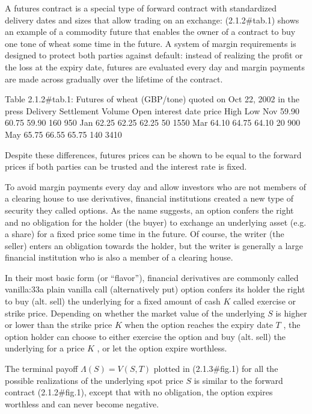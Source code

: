 \documentclass{beamer}
\begin{document}
\begin{frame}
A futures contract is a special type of forward contract with standardized delivery dates and sizes that allow trading on an exchange: (2.1.2#tab.1) shows an example of a commodity future that enables the owner of a contract to buy one tone of wheat some time in the future. A system of margin requirements is designed to protect both parties against default: instead of realizing the profit or the loss at the expiry date, futures are evaluated every day and margin payments are made across gradually over the lifetime of the contract. 

Table 2.1.2#tab.1: Futures of wheat (GBP/tone) quoted on Oct 22, 2002 in the press
Delivery	 Settlement		 Volume	 Open interest
date	 price	 High	 Low		
Nov	 59.90	 60.75	 59.90	 160	 950
Jan	 62.25	 62.25	 62.25	 50	 1550
Mar	 64.10	 64.75	 64.10	 20	 900
May	 65.75	 66.55	 65.75	 140	 3410

Despite these differences, futures prices can be shown to be equal to the forward prices if both parties can be trusted and the interest rate is fixed.



To avoid margin payments every day and allow investors who are not members of a clearing house to use derivatives, financial institutions created a new type of security they called options. As the name suggests, an option confers the right and no obligation for the holder (the buyer) to exchange an underlying asset (e.g. a share) for a fixed price some time in the future. Of course, the writer (the seller) enters an obligation towards the holder, but the writer is generally a large financial institution who is also a member of a clearing house.

In their most basic form (or ``flavor''), financial derivatives are commonly called vanilla:33a plain vanilla call (alternatively put) option confers its holder the right to buy (alt. sell) the underlying for a fixed amount of cash $ K$ called exercise or strike price. Depending on whether the market value of the underlying $ S$ is higher or lower than the strike price $ K$ when the option reaches the expiry date $ T$ , the option holder can choose to either exercise the option and buy (alt. sell) the underlying for a price $ K$ , or let the option expire worthless.

The terminal payoff  $ \Lambda (S)=V(S,T)$ plotted in (2.1.3#fig.1) for all the possible realizations of the underlying spot price $ S$ is similar to the forward contract (2.1.2#fig.1), except that with no obligation, the option expires worthless and can never become negative.


\end{frame}
\end{document}

